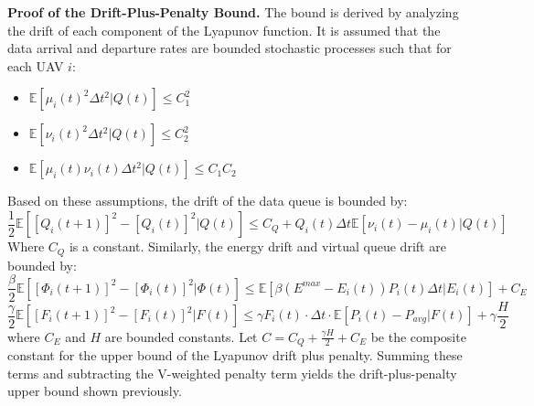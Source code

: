\documentclass[runningheads]{llncs}
\begin{document}
\textbf{Proof of the Drift-Plus-Penalty Bound.}
The bound is derived by analyzing the drift of each component of the Lyapunov function. It is assumed that the data arrival and departure rates are bounded stochastic processes such that for each UAV $i$:
\begin{itemize}
    \item $\mathbb{E}[\mu_{i}(t)^{2}\Delta t^{2}|Q(t)]\le C_{1}^{2}$
    \item $\mathbb{E}[\nu_{i}(t)^{2}\Delta t^{2}|Q(t)]\le C_{2}^{2}$
    \item $\mathbb{E}[\mu_{i}(t)\nu_{i}(t)\Delta t^{2}|Q(t)]\le C_{1}C_{2}$
\end{itemize}
Based on these assumptions, the drift of the data queue is bounded by:
\begin{equation}
\frac{1}{2}\mathbb{E}[[Q_{i}(t+1)]^{2}-[Q_{i}(t)]^{2}|Q(t)]\le C_{Q}+Q_{i}(t)\Delta t\mathbb{E}[\nu_{i}(t)-\mu_{i}(t)|Q(t)]
\end{equation} 
Where $C_Q$ is a constant. Similarly, the energy drift and virtual queue drift are bounded by:
\begin{equation}
    \frac{\beta}{2}\mathbb{E}[[\Phi_{i}(t+1)]^{2}-[\Phi_{i}(t)]^{2}|\Phi(t)]\le\mathbb{E}[\beta(E^{max}-E_i(t))P_i(t)\Delta t|E_i(t)]+C_E
\end{equation}
\begin{equation}
    \frac{\gamma}{2}\mathbb{E}[[F_{i}(t+1)]^{2}-[F_{i}(t)]^{2}|F(t)]\le\gamma F_{i}(t)\cdot\Delta t\cdot\mathbb{E}[P_{i}(t)-P_{avg}|F(t)]+\gamma\frac{H}{2}
\end{equation}
where $C_E$ and $H$ are bounded constants. Let $C=C_{Q}+\frac{\gamma H}{2}+C_E$ be the composite constant for the upper bound of the Lyapunov drift plus penalty. Summing these terms and subtracting the V-weighted penalty term yields the drift-plus-penalty upper bound shown previously.
\end{document}
